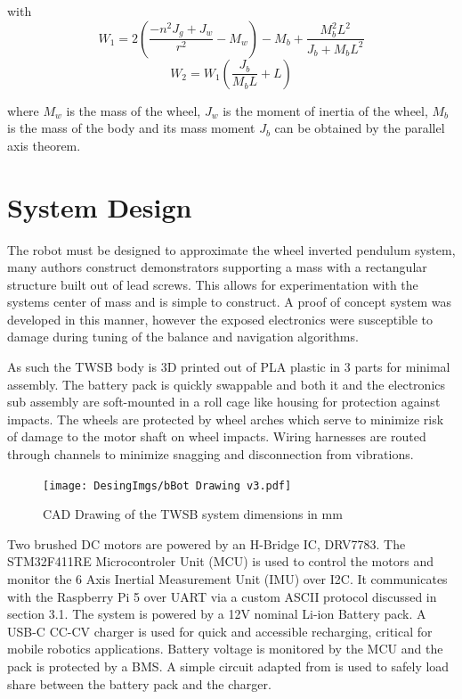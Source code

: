     with 
    \[
    W_1 = 2\left(\frac{-n^2 J_g + J_w }{r^2 } - M_w \right) - M_b + \frac{M_b^2 L^2 }{J_b + M_b L^2 }
    \]
    \[
    W_2 = W_1 \left(\frac{J_b }{M_b L} + L\right)
    \]

    where $M_w$ is the mass of the wheel, $J_w$ is the moment of inertia of the wheel, 
    $M_b$ is the mass of the body and its mass moment $J_b$ can be obtained by the parallel axis theorem.

 
    \pagebreak{}

    \section{System Design}
        The robot must be designed to approximate the wheel inverted pendulum system, many authors 
        construct demonstrators supporting a mass with a rectangular structure built out of lead screws. 
        This allows for experimentation with the systems center of mass and is simple to construct. 
        A proof of concept system was developed in this manner, however the exposed electronics were 
        susceptible to damage during tuning of the balance and navigation algorithms.

        As such the TWSB body is 3D printed out of PLA plastic in 3 parts for minimal assembly.
        The battery pack is quickly swappable and both it and the electronics sub assembly 
        are soft-mounted in a roll cage like housing for protection against impacts. 
        The wheels are protected by wheel arches which serve to minimize risk of damage to the motor shaft on wheel impacts. 
        Wiring harnesses are routed through channels to minimize snagging and disconnection from vibrations.
        
        \begin{figure}[H]
            \texttt{[image: DesingImgs/bBot Drawing v3.pdf]}
            \caption{CAD Drawing of the TWSB system dimensions in mm}
            \label{fig:CAD}
        \end{figure}

        Two brushed DC motors are powered by an H-Bridge IC, DRV7783. 
        The STM32F411RE Microcontroler Unit (MCU) is used to control the 
        motors and monitor the 6 Axis Inertial Measurement Unit (IMU) over I2C. It communicates with the 
        Raspberry Pi 5 over UART via a custom ASCII protocol discussed in section 3.1. 
        The system is powered by a 12V nominal Li-ion Battery pack. A USB-C CC-CV charger is used for quick 
        and accessible recharging, critical for mobile robotics applications. 
        Battery voltage is monitored by the MCU and the pack is protected by a BMS.
        A simple circuit adapted from \cite{chu2008designing} is used to safely load share between the battery pack and the charger.


